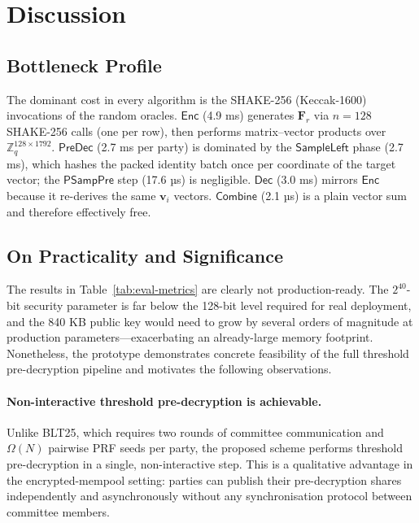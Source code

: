 \section{Discussion}
\label{sec:discussion-eval}

\subsection{Bottleneck Profile}

The dominant cost in every algorithm is the SHAKE-256 (Keccak-1600) invocations of the
random oracles.
$\mathsf{Enc}$ (4.9 ms) generates $\mathbf{F}_r$ via $n=128$ SHAKE-256 calls (one per
row), then performs matrix--vector products over $\mathbb{Z}_q^{128\times 1792}$.
$\mathsf{PreDec}$ (2.7 ms per party) is dominated by the $\mathsf{SampleLeft}$ phase
(2.7 ms), which hashes the packed identity batch once per coordinate of the target vector;
the $\mathsf{PSampPre}$ step (17.6 µs) is negligible.
$\mathsf{Dec}$ (3.0 ms) mirrors $\mathsf{Enc}$ because it re-derives the same
$\mathbf{v}_i$ vectors.
$\mathsf{Combine}$ (2.1 µs) is a plain vector sum and therefore effectively free.

\subsection{On Practicality and Significance}

The results in Table~\ref{tab:eval-metrics} are clearly not production-ready.
The $2^{40}$-bit security parameter is far below the 128-bit level required for real
deployment, and the 840 KB public key would need to grow by several orders of magnitude at
production parameters—exacerbating an already-large memory footprint.
Nonetheless, the prototype demonstrates concrete feasibility of the full threshold
pre-decryption pipeline and motivates the following observations.

\paragraph{Non-interactive threshold pre-decryption is achievable.}
Unlike \textsf{BLT25}, which requires two rounds of committee communication and
$\Omega(N)$ pairwise PRF seeds per party, the proposed scheme performs threshold
pre-decryption in a single, non-interactive step.
This is a qualitative advantage in the encrypted-mempool setting: parties can publish their
pre-decryption shares independently and asynchronously without any synchronisation protocol
between committee members.

